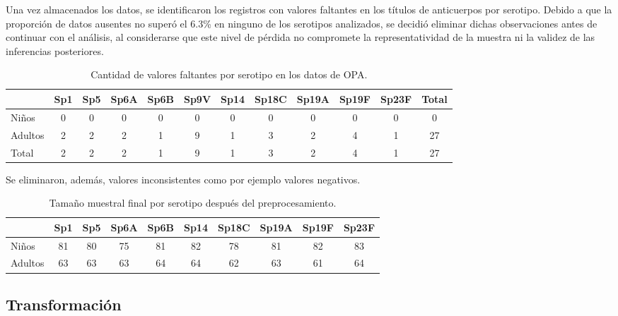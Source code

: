 Una vez almacenados los datos, se identificaron los registros con valores faltantes en los títulos de anticuerpos por serotipo. Debido a que la proporción de datos ausentes no superó el 6.3\% en ninguno de los serotipos analizados, se decidió eliminar dichas observaciones antes de continuar con el análisis, al considerarse que este nivel de pérdida no compromete la representatividad de la muestra ni la validez de las inferencias posteriores.

\begin{table}[ht]
	\centering
	\caption{Cantidad de valores faltantes por serotipo en los datos de OPA.}
	\label{tab:nulls_opa}
	\small
	\begin{tabular}{lccccccccccc}
		\hline
		& Sp1 & Sp5 & Sp6A & Sp6B & Sp9V & Sp14 & Sp18C & Sp19A & Sp19F & Sp23F & Total \\
		\hline
		Niños   & 0 & 0 & 0 & 0 & 0 & 0 & 0 & 0 & 0 & 0 & 0  \\
		Adultos & 2 & 2 & 2 & 1 & 9 & 1 & 3 & 2 & 4 & 1 & 27 \\
		\hline
		Total   & 2 & 2 & 2 & 1 & 9 & 1 & 3 &2 & 4 & 1 & 27 \\
		\hline
	\end{tabular}
\end{table}
\FloatBarrier

Se eliminaron, además, valores inconsistentes como por ejemplo valores negativos.

\begin{table}[ht]
	\centering
	\caption{Tamaño muestral final por serotipo después del preprocesamiento.}
	\label{tab:n_final_serotipos}
	\begin{tabular}{lccccccccc}
		\hline
		& Sp1 & Sp5 & Sp6A & Sp6B & Sp14 & Sp18C & Sp19A & Sp19F & Sp23F \\
		\hline
		Niños   & 81 & 80 & 75 & 81 & 82 & 78 & 81 & 82 & 83 \\
		Adultos & 63 & 63 & 63 & 64 & 64 & 62 & 63 & 61 & 64 \\
		\hline
	\end{tabular}
\end{table}

\FloatBarrier

\subsection{Transformación}

